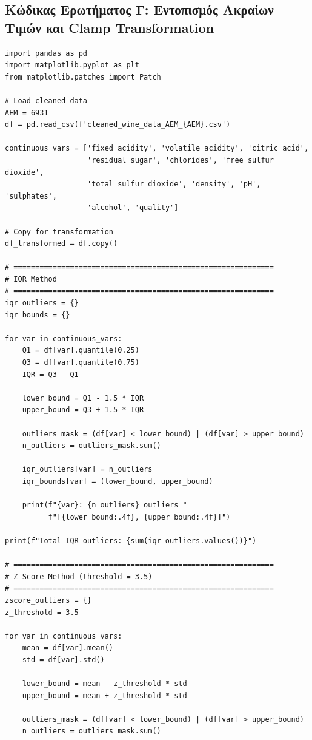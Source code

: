 \documentclass[12pt,a4paper]{article}
\begin{document}
\subsection{Κώδικας Ερωτήματος Γ: Εντοπισμός Ακραίων Τιμών και Clamp Transformation}

\begin{lstlisting}
import pandas as pd
import matplotlib.pyplot as plt
from matplotlib.patches import Patch

# Load cleaned data
AEM = 6931
df = pd.read_csv(f'cleaned_wine_data_AEM_{AEM}.csv')

continuous_vars = ['fixed acidity', 'volatile acidity', 'citric acid',
                   'residual sugar', 'chlorides', 'free sulfur dioxide',
                   'total sulfur dioxide', 'density', 'pH', 'sulphates',
                   'alcohol', 'quality']

# Copy for transformation
df_transformed = df.copy()

# ============================================================
# IQR Method
# ============================================================
iqr_outliers = {}
iqr_bounds = {}

for var in continuous_vars:
    Q1 = df[var].quantile(0.25)
    Q3 = df[var].quantile(0.75)
    IQR = Q3 - Q1

    lower_bound = Q1 - 1.5 * IQR
    upper_bound = Q3 + 1.5 * IQR

    outliers_mask = (df[var] < lower_bound) | (df[var] > upper_bound)
    n_outliers = outliers_mask.sum()

    iqr_outliers[var] = n_outliers
    iqr_bounds[var] = (lower_bound, upper_bound)

    print(f"{var}: {n_outliers} outliers "
          f"[{lower_bound:.4f}, {upper_bound:.4f}]")

print(f"Total IQR outliers: {sum(iqr_outliers.values())}")

# ============================================================
# Z-Score Method (threshold = 3.5)
# ============================================================
zscore_outliers = {}
z_threshold = 3.5

for var in continuous_vars:
    mean = df[var].mean()
    std = df[var].std()

    lower_bound = mean - z_threshold * std
    upper_bound = mean + z_threshold * std

    outliers_mask = (df[var] < lower_bound) | (df[var] > upper_bound)
    n_outliers = outliers_mask.sum()


\end{lstlisting}
\end{document}
